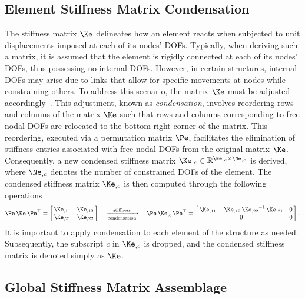 \subsection{Element Stiffness Matrix Condensation}

The stiffness matrix $\Ke$ delineates how an element reacts when subjected to unit displacements imposed at each of its nodes' \acp{DOF}. Typically, when deriving such a matrix, it is assumed that the element is rigidly connected at each of its nodes' \acp{DOF}, thus possessing no internal \acp{DOF}. However, in certain structures, internal \acp{DOF} may arise due to links that allow for specific movements at nodes while constraining others. To address this scenario, the matrix $\Ke$ must be adjusted accordingly~\cite{logan2002first}. This adjustment, known as \emph{condensation}, involves reordering rows and columns of the matrix $\Ke$ such that rows and columns corresponding to free nodal \acp{DOF} are relocated to the bottom-right corner of the matrix. This reordering, executed via a permutation matrix $\Pe$, facilitates the elimination of stiffness entries associated with free nodal \acp{DOF} from the original matrix $\Ke$. Consequently, a new condensed stiffness matrix ${\Ke}_{,c} \in \mathbb{R}^{{\Ne}_{,c} \times {\Ne}_{,c}}$ is derived, where ${\Ne}_{,c}$ denotes the number of constrained \acp{DOF} of the element. The condensed stiffness matrix ${\Ke}_{,c}$ is then computed through the following operations
%
\begin{equation*}
  \Pe \, \Ke \, \Pe^\top= \left[\,\begin{matrix}
    {\Ke}_{,11} & {\Ke}_{,12} \\
    {\Ke}_{,21} & {\Ke}_{,22}
  \end{matrix}\,\right] \quad \xrightarrow[\text{condensation}]{\text{stiffness}} \quad
   \Pe \, {\Ke}_{,c} \, \Pe^\top = \left[\,\begin{matrix}
    {\Ke}_{,11} - {\Ke}_{,12} \, {{\Ke}_{,22}}^{-1} \, {\Ke}_{,21} & 0 \\
    0 & 0
  \end{matrix}\,\right] \, \text{.}
\end{equation*}
%
It is important to apply condensation to each element of the structure as needed. Subsequently, the subscript $c$ in ${\Ke}_{,c}$ is dropped, and the condensed stiffness matrix is denoted simply as $\Ke$.

\subsection{Global Stiffness Matrix Assemblage}

